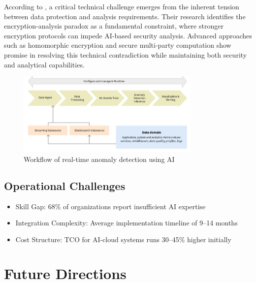 \documentclass[a4paper,12pt]{article}
\begin{document}
According to \citet{alouffi2021}, a critical technical challenge emerges from the inherent tension between data protection and analysis requirements. Their research identifies the encryption-analysis paradox as a fundamental constraint, where stronger encryption protocols can impede AI-based security analysis. Advanced approaches such as homomorphic encryption and secure multi-party computation show promise in resolving this technical contradiction while maintaining both security and analytical capabilities.

\begin{figure}[H]
    \centering
    \includegraphics[width=0.8\textwidth]{image3.png}
    \caption{Workflow of real-time anomaly detection using AI}
    \label{fig:workflow-anomaly-detection-ai}
\end{figure}

\subsection{Operational Challenges}
\begin{itemize}
    \item Skill Gap: 68\% of organizations report insufficient AI expertise
    \item Integration Complexity: Average implementation timeline of 9--14 months
    \item Cost Structure: TCO for AI-cloud systems runs 30--45\% higher initially
\end{itemize}

\section{Future Directions}
\end{document}
